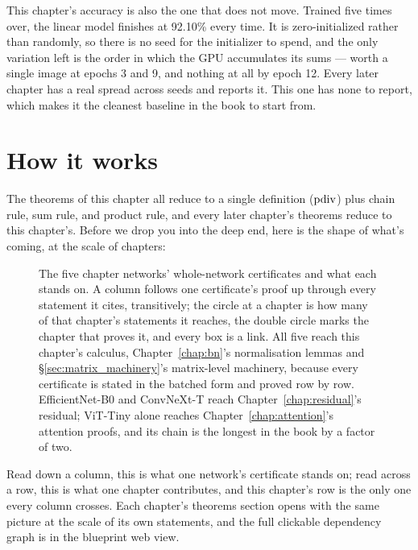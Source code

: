 This chapter's accuracy is also the one that does not move. Trained five
times over, the linear model finishes at 92.10\% every time. It is
zero-initialized rather than randomly, so there is no seed for the
initializer to spend, and the only variation left is the order in which
the GPU accumulates its sums --- worth a single image at epochs 3 and 9,
and nothing at all by epoch 12. Every later chapter has a real spread
across seeds and reports it. This one has none to report, which makes it
the cleanest baseline in the book to start from.

\section{How it works}

The theorems of this chapter all reduce to a single definition
(\(\operatorname{pdiv}\)) plus chain rule, sum rule, and product rule, and every later
chapter's theorems reduce to this chapter's. Before we drop you into the
deep end, here is the shape of what's coming, at the scale of chapters:

\begin{figure}[H]
\centering

\caption{The five chapter networks' whole-network certificates and what each
stands on. A column follows one certificate's proof up through every statement it
cites, transitively; the circle at a chapter is how many of that chapter's
statements it reaches, the double circle marks the chapter that proves it,
and every box is a link. All five reach this chapter's calculus,
Chapter~\ref{chap:bn}'s normalisation lemmas and
\S\ref{sec:matrix_machinery}'s matrix-level machinery, because every
certificate is stated in the batched form and proved row by row.
EfficientNet-B0 and ConvNeXt-T reach Chapter~\ref{chap:residual}'s
residual; ViT-Tiny alone reaches Chapter~\ref{chap:attention}'s attention
proofs, and its chain is the longest in the book by a factor of two.}
\label{fig:spines}
\end{figure}

Read down a column, this is what one network's certificate stands on;
read across a row, this is what one chapter contributes, and this
chapter's row is the only one every column crosses. Each chapter's
theorems section opens with the same picture at the scale of its own
statements, and the full clickable dependency graph is in the blueprint
web view.

